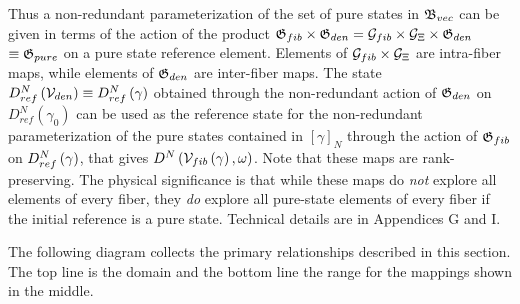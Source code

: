 Thus a non-redundant parameterization of the set of pure states in ${\frak B}%
_{vec}$ can be given in terms of the action of the product ${\frak G}%
_{fib}\times {\frak G}_{den}={\cal G}_{fib}\times {\cal G}_{\Xi }\times 
{\frak G}_{den}$ $\equiv {\frak G}_{pure}$ on a pure state reference
element. Elements of ${\cal G}_{fib}\times {\cal G}_{\Xi }$ are intra-fiber
maps, while elements of ${\frak G}_{den}$ are inter-fiber maps. The state $%
D_{ref}^{N}\left( {\cal V}_{den}\right) \equiv D_{ref}^{N}\left( {\cal %
\gamma }\right) $ obtained through the non-redundant action of ${\frak G}%
_{den}$ on $D_{ref}^{N}\left( \gamma _{0}\right) $ can be used as the
reference state for the non-redundant parameterization of the pure states
contained in $\left[ \gamma \right] _{N}$ through the action of ${\frak G}%
_{fib}$ on $D_{ref}^{N}\left( {\cal \gamma }\right) $, that gives $%
D^{N}\left( {\cal V}_{fib}\left( \gamma \right) ,{\cal \omega }\right) $.
Note that these maps are rank-preserving. The physical significance is that
while these maps do {\em not} explore all elements of every fiber, they {\em %
do} explore all pure-state elements of every fiber if the initial reference
is a pure state. Technical details are in Appendices G and I.

The following diagram collects the primary relationships described in this
section. The top line is the domain and the bottom line the range for the
mappings shown in the middle.


